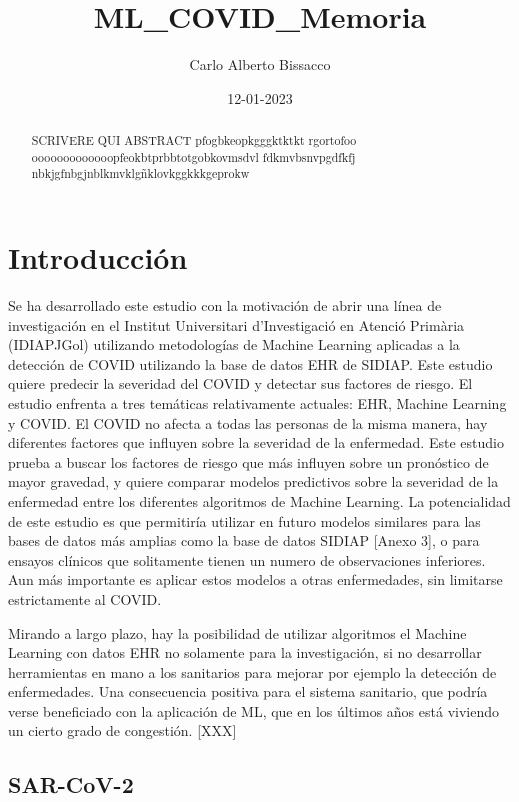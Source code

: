 \documentclass[
]{article}
\title{ML\_COVID\_Memoria}
\author{Carlo Alberto Bissacco}
\date{12-01-2023}
\begin{document}
\maketitle
\begin{abstract}
SCRIVERE QUI ABSTRACT pfogbkeopkgggktktkt rgortofoo
ooooooooooooopfeokbtprbbtotgobkovmsdvl fdkmvbsnvpgdfkfj
nbkjgfnbgjnblkmvklgñklovkggkkkgeprokw
\end{abstract}

{
\hypersetup{linkcolor=}
\setcounter{tocdepth}{2}
\tableofcontents
}
\pagebreak

\hypertarget{introducciuxf3n}{%
\section{Introducción}\label{introducciuxf3n}}

Se ha desarrollado este estudio con la motivación de abrir una línea de
investigación en el Institut Universitari d'Investigació en Atenció
Primària (IDIAPJGol) utilizando metodologías de Machine Learning
aplicadas a la detección de COVID utilizando la base de datos EHR de
SIDIAP. Este estudio quiere predecir la severidad del COVID y detectar
sus factores de riesgo. El estudio enfrenta a tres temáticas
relativamente actuales: EHR, Machine Learning y COVID. El COVID no
afecta a todas las personas de la misma manera, hay diferentes factores
que influyen sobre la severidad de la enfermedad. Este estudio prueba a
buscar los factores de riesgo que más influyen sobre un pronóstico de
mayor gravedad, y quiere comparar modelos predictivos sobre la severidad
de la enfermedad entre los diferentes algoritmos de Machine Learning. La
potencialidad de este estudio es que permitiría utilizar en futuro
modelos similares para las bases de datos más amplias como la base de
datos SIDIAP {[}Anexo 3{]}, o para ensayos clínicos que solitamente
tienen un numero de observaciones inferiores. Aun más importante es
aplicar estos modelos a otras enfermedades, sin limitarse estrictamente
al COVID.

Mirando a largo plazo, hay la posibilidad de utilizar algoritmos el
Machine Learning con datos EHR no solamente para la investigación, si no
desarrollar herramientas en mano a los sanitarios para mejorar por
ejemplo la detección de enfermedades. Una consecuencia positiva para el
sistema sanitario, que podría verse beneficiado con la aplicación de ML,
que en los últimos años está viviendo un cierto grado de congestión.
{[}XXX{]}

\hypertarget{sar-cov-2}{%
\subsection{SAR-CoV-2}\label{sar-cov-2}}
\end{document}
